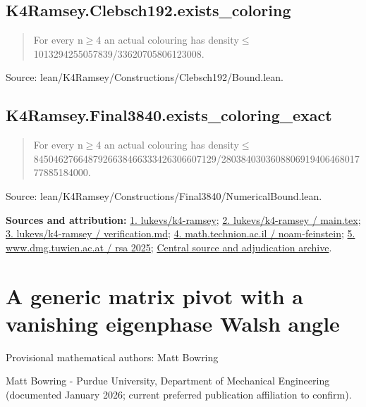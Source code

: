 \documentclass[11pt,a4paper]{article}
\begin{document}
\begin{samepage}
\subsection{K4Ramsey.Clebsch192.exists\_coloring}
\begin{quote}\small\ttfamily For every n\ensuremath{\geq}4 an actual colouring has density\ensuremath{\leq}1013294255057839/33620705806123008.\end{quote}
{\small Source: lean/K4Ramsey/Constructions/Clebsch192/Bound.lean.\par}

\end{samepage}
\begin{samepage}
\subsection{K4Ramsey.Final3840.exists\_coloring\_exact}
\begin{quote}\small\ttfamily For every n\ensuremath{\geq}4 an actual colouring has density\ensuremath{\leq}8450462766487926638466333426306607129/280384030360880691940646801777885184000.\end{quote}
{\small Source: lean/K4Ramsey/Constructions/Final3840/NumericalBound.lean.\par}

{\small\textbf{Sources and attribution:} \href{https://github.com/lukevs/k4-ramsey/tree/2cf216ba885fbb1b2d1b2d4920efeaa6ba438842}{1. lukevs/k4-ramsey}; \href{https://github.com/lukevs/k4-ramsey/blob/2cf216ba885fbb1b2d1b2d4920efeaa6ba438842/paper/main.tex}{2. lukevs/k4-ramsey / main.tex}; \href{https://github.com/lukevs/k4-ramsey/blob/2cf216ba885fbb1b2d1b2d4920efeaa6ba438842/docs/verification.md}{3. lukevs/k4-ramsey / verification.md}; \href{https://math.technion.ac.il/events/noam-feinstein/}{4. math.technion.ac.il / noam-feinstein}; \href{https://www.dmg.tuwien.ac.at/rsa2025/}{5. www.dmg.tuwien.ac.at / rsa 2025}; \href{https://github.com/alejandrozu/openmath-2026-judging}{Central source and adjudication archive}.\par}

\end{samepage}
\clearpage
\section{A generic matrix pivot with a vanishing eigenphase Walsh angle}
{\small Provisional mathematical authors: Matt Bowring\par}\medskip
{\small Matt Bowring  -  Purdue University, Department of Mechanical Engineering (documented January 2026; current preferred publication affiliation to confirm).\par}
\end{document}
